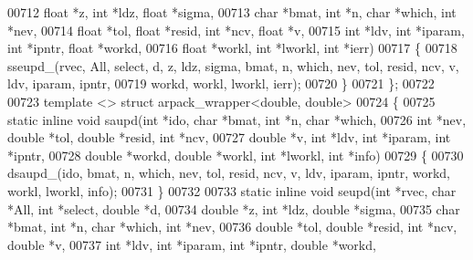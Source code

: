 \begin{DoxyCode}
00712       \textcolor{keywordtype}{float} *z, \textcolor{keywordtype}{int} *ldz, \textcolor{keywordtype}{float} *sigma,
00713       \textcolor{keywordtype}{char} *bmat, \textcolor{keywordtype}{int} *n, \textcolor{keywordtype}{char} *which, \textcolor{keywordtype}{int} *nev,
00714       \textcolor{keywordtype}{float} *tol, \textcolor{keywordtype}{float} *resid, \textcolor{keywordtype}{int} *ncv, \textcolor{keywordtype}{float} *v,
00715       \textcolor{keywordtype}{int} *ldv, \textcolor{keywordtype}{int} *iparam, \textcolor{keywordtype}{int} *ipntr, \textcolor{keywordtype}{float} *workd,
00716       \textcolor{keywordtype}{float} *workl, \textcolor{keywordtype}{int} *lworkl, \textcolor{keywordtype}{int} *ierr)
00717   \{
00718     sseupd\_(rvec, All, select, d, z, ldz, sigma, bmat, n, which, nev, tol, resid, ncv, v, ldv, iparam, 
      ipntr,
00719         workd, workl, lworkl, ierr);
00720   \}
00721 \};
00722 
00723 \textcolor{keyword}{template} <> \textcolor{keyword}{struct }arpack\_wrapper<double, double>
00724 \{
00725   \textcolor{keyword}{static} \textcolor{keyword}{inline} \textcolor{keywordtype}{void} saupd(\textcolor{keywordtype}{int} *ido, \textcolor{keywordtype}{char} *bmat, \textcolor{keywordtype}{int} *n, \textcolor{keywordtype}{char} *which,
00726       \textcolor{keywordtype}{int} *nev, \textcolor{keywordtype}{double} *tol, \textcolor{keywordtype}{double} *resid, \textcolor{keywordtype}{int} *ncv,
00727       \textcolor{keywordtype}{double} *v, \textcolor{keywordtype}{int} *ldv, \textcolor{keywordtype}{int} *iparam, \textcolor{keywordtype}{int} *ipntr,
00728       \textcolor{keywordtype}{double} *workd, \textcolor{keywordtype}{double} *workl, \textcolor{keywordtype}{int} *lworkl, \textcolor{keywordtype}{int} *info)
00729   \{
00730     dsaupd\_(ido, bmat, n, which, nev, tol, resid, ncv, v, ldv, iparam, ipntr, workd, workl, lworkl, info);
00731   \}
00732 
00733   \textcolor{keyword}{static} \textcolor{keyword}{inline} \textcolor{keywordtype}{void} seupd(\textcolor{keywordtype}{int} *rvec, \textcolor{keywordtype}{char} *All, \textcolor{keywordtype}{int} *select, \textcolor{keywordtype}{double} *d,
00734       \textcolor{keywordtype}{double} *z, \textcolor{keywordtype}{int} *ldz, \textcolor{keywordtype}{double} *sigma,
00735       \textcolor{keywordtype}{char} *bmat, \textcolor{keywordtype}{int} *n, \textcolor{keywordtype}{char} *which, \textcolor{keywordtype}{int} *nev,
00736       \textcolor{keywordtype}{double} *tol, \textcolor{keywordtype}{double} *resid, \textcolor{keywordtype}{int} *ncv, \textcolor{keywordtype}{double} *v,
00737       \textcolor{keywordtype}{int} *ldv, \textcolor{keywordtype}{int} *iparam, \textcolor{keywordtype}{int} *ipntr, \textcolor{keywordtype}{double} *workd,

\end{DoxyCode}
